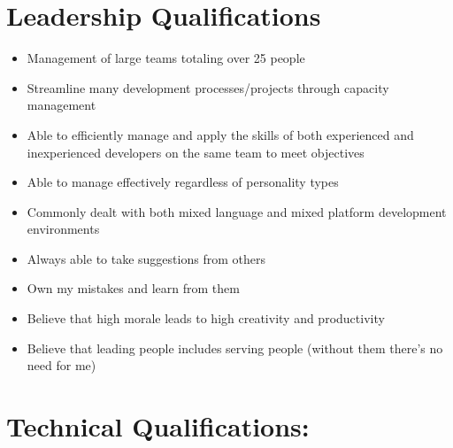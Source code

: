 \documentclass[10pt]{report}
\begin{document}

\vspace{-5em}

\section*{Leadership Qualifications}
\begin{itemize}
	\item Management of large teams totaling over 25 people
	\item Streamline many development processes/projects through capacity management
	\item Able to efficiently manage and apply the skills of both experienced and inexperienced developers on the same team to meet objectives
	\item Able to manage effectively regardless of personality types
	\item Commonly dealt with both mixed language and mixed platform development environments
	\item Always able to take suggestions from others
	\item Own my mistakes and learn from them
	\item Believe that high morale leads to high creativity and productivity
	\item Believe that leading people includes serving people (without them there's no need for me)
\end{itemize}

\section*{Technical Qualifications:}
\end{document}
